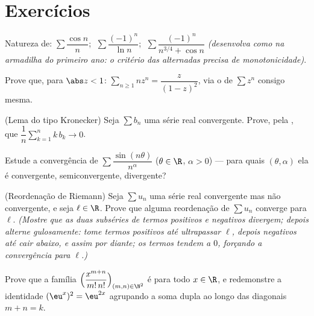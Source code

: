 \section{Exercícios}

\begin{exercise}[$\star$]\label{exo:b2:series:1}
Natureza de: $\sum \dfrac{\cos n}{n}$; $\;\sum \dfrac{(-1)^n}{\ln
n}$; $\;\sum \dfrac{(-1)^n}{n^{3/4} + \cos n}$ \emph{(desenvolva como na
armadilha do primeiro ano: o critério das alternadas precisa de monotonicidade)}.
\end{exercise}

\begin{exercise}[$\star$]\label{exo:b2:series:2}
Prove que, para $\abs z < 1$: $\sum_{n\geq1} n z^{n} =
\dfrac{z}{(1-z)^2}$, via o  de $\sum z^n$ consigo
mesma.
\end{exercise}

\begin{exercise}[$\star\star$]\label{exo:b2:series:3}
(Lema do tipo Kronecker) Seja $\sum b_n$ uma série real convergente.
Prove, pela , que $\dfrac{1}{n}\sum_{k=1}^{n} k\,b_k
\to 0$.
\end{exercise}

\begin{exercise}[$\star\star$]\label{exo:b2:series:4}
Estude a convergência de $\sum \dfrac{\sin(n\theta)}{n^\alpha}$
($\theta \in \R$, $\alpha > 0$) --- para quais $(\theta, \alpha)$ ela é
 convergente, semiconvergente, divergente?
\end{exercise}

\begin{exercise}[$\star\star\star$]\label{exo:b2:series:5}
(Reordenação de Riemann) Seja $\sum u_n$ uma série real convergente mas não
 convergente, e seja $\ell \in \R$. Prove que
alguma reordenação de $\sum u_n$ converge para $\ell$.
\emph{(Mostre que as duas subséries de termos positivos e negativos divergem;
depois alterne gulosamente: tome termos positivos até ultrapassar
$\ell$, depois negativos até cair abaixo, e assim por diante; os termos
tendem a $0$, forçando a convergência para $\ell$.)}
\end{exercise}

\begin{exercise}[$\star\star$]\label{exo:b2:series:6}
Prove que a família
$\Bigl(\dfrac{x^{m+n}}{m!\,n!}\Bigr)_{(m,n)\in\N^2}$ é 
para todo $x \in \R$, e redemonstre a identidade $(\eu^x)^2 =
\eu^{2x}$ agrupando a soma dupla ao longo das diagonais $m + n =
k$.
\end{exercise}

